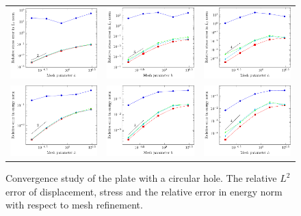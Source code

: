 \documentclass{article}
\begin{document}
\begin{figure}[h]
\begin{tabular}{ccc}
\includegraphics[width=.31\linewidth]{stress_p_2} & \includegraphics[width=.31\linewidth]{stress_p_3} & \includegraphics[width=.31\linewidth]{stress_p_4}\\
\includegraphics[width=.31\linewidth]{energy_p_2} & \includegraphics[width=.31\linewidth]{energy_p_3} & \includegraphics[width=.31\linewidth]{energy_p_4}
\end{tabular}
    \caption{Convergence study of the plate with a circular hole. The relative $L^2$ error of displacement, stress and the relative error in energy norm with respect to mesh refinement.}
	\label{fig:platewithhole_convergence}
\end{figure}
\end{document}
